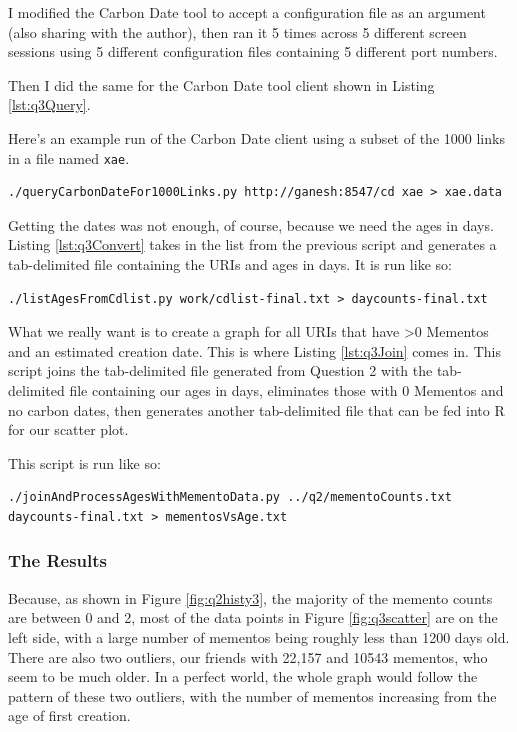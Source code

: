 \documentclass[letterpaper,11pt]{article}
\begin{document}
I modified the Carbon Date tool to accept a configuration file as an argument (also sharing with the author), then ran it 5 times across 5 different screen sessions using 5 different configuration files containing 5 different port numbers.

Then I did the same for the Carbon Date tool client shown in Listing \ref{lst:q3Query}.

Here's an example run of the Carbon Date client using a subset of the 1000 links in a file named \verb+xae+.
\begin{lstlisting}[frame=single]
./queryCarbonDateFor1000Links.py http://ganesh:8547/cd xae > xae.data
\end{lstlisting}

Getting the dates was not enough, of course, because we need the ages in days.  Listing \ref{lst:q3Convert} takes in the list from the previous script and generates a tab-delimited file containing the URIs and ages in days.  It is run like so:
\begin{lstlisting}[frame=single]
./listAgesFromCdlist.py work/cdlist-final.txt > daycounts-final.txt
\end{lstlisting}

What we really want is to create a graph for all URIs that have \textgreater 0 Mementos and an estimated creation date.  This is where Listing \ref{lst:q3Join} comes in.  This script joins the tab-delimited file generated from Question 2 with the tab-delimited file containing our ages in days, eliminates those with 0 Mementos and no carbon dates, then generates another tab-delimited file that can be fed into R for our scatter plot.

This script is run like so:
\begin{lstlisting}[frame=single]
./joinAndProcessAgesWithMementoData.py ../q2/mementoCounts.txt daycounts-final.txt > mementosVsAge.txt
\end{lstlisting}

\subsubsection*{The Results}

Because, as shown in Figure \ref{fig:q2histy3}, the majority of the memento counts are between 0 and 2, most of the data points in Figure \ref{fig:q3scatter} are on the left side, with a large number of mementos being roughly less than 1200 days old.  There are also two outliers, our friends with 22,157 and 10543 mementos, who seem to be much older.  In a perfect world, the whole graph would follow the pattern of these two outliers, with the number of mementos increasing from the age of first creation.
\end{document}
